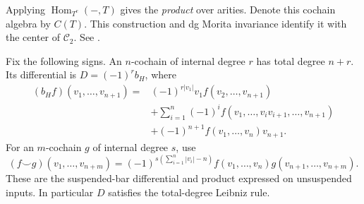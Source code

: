 Applying
\(\operatorname{Hom}_{T^e}(-,T)\) gives the \emph{product} over arities.
Denote this cochain algebra by \(C(T)\).
This construction and dg Morita invariance identify it with the center
of \(\mathcal C_2\). See \cite[\S5.4]{Keller2006DG}.

Fix the following signs.  An \(n\)-cochain of internal degree \(r\)
has total degree \(n+r\).  Its differential is \(D=(-1)^r b_H\), where
\begin{align*}
 (b_H f)(v_1,\ldots,v_{n+1})={}&
 (-1)^{r|v_1|}v_1f(v_2,\ldots,v_{n+1})\\
 &+\sum_{i=1}^{n}(-1)^i
 f(v_1,\ldots,v_iv_{i+1},\ldots,v_{n+1})\\
 &+(-1)^{n+1}f(v_1,\ldots,v_n)v_{n+1}.
\end{align*}
For an \(m\)-cochain \(g\) of internal degree \(s\), use
\begin{equation}\label{cbc:rc:eq:cup}
 (f\smile g)(v_1,\ldots,v_{n+m})=
 (-1)^{s(\sum_{i=1}^n|v_i|-n)}
 f(v_1,\ldots,v_n)g(v_{n+1},\ldots,v_{n+m}).
\end{equation}
These are the suspended-bar differential and product expressed on
unsuspended inputs. In particular \(D\) satisfies the total-degree
Leibniz rule.


